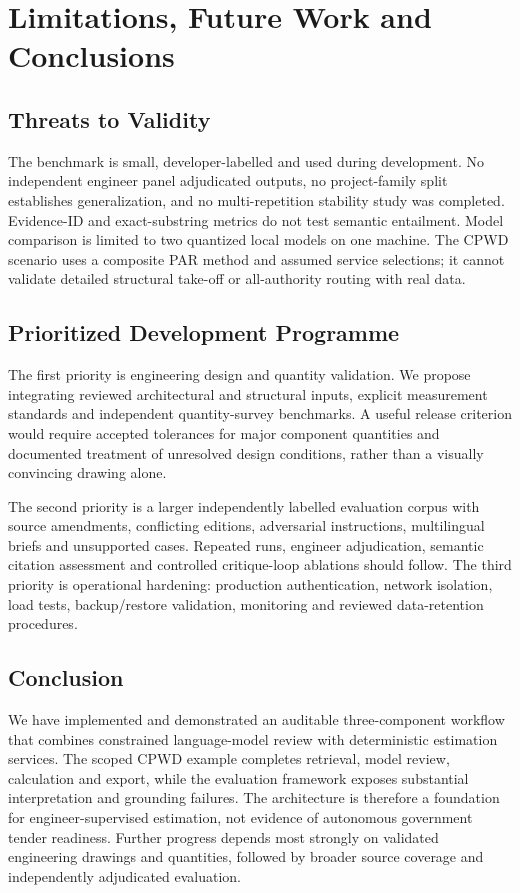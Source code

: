 \documentclass[11pt,a4paper]{article}
\begin{document}
\section{Limitations, Future Work and Conclusions}
\subsection{Threats to Validity}
The benchmark is small, developer-labelled and used during development. No independent engineer panel adjudicated outputs, no project-family split establishes generalization, and no multi-repetition stability study was completed. Evidence-ID and exact-substring metrics do not test semantic entailment. Model comparison is limited to two quantized local models on one machine. The CPWD scenario uses a composite PAR method and assumed service selections; it cannot validate detailed structural take-off or all-authority routing with real data.

\subsection{Prioritized Development Programme}
The first priority is engineering design and quantity validation. We propose integrating reviewed architectural and structural inputs, explicit measurement standards and independent quantity-survey benchmarks. A useful release criterion would require accepted tolerances for major component quantities and documented treatment of unresolved design conditions, rather than a visually convincing drawing alone.

The second priority is a larger independently labelled evaluation corpus with source amendments, conflicting editions, adversarial instructions, multilingual briefs and unsupported cases. Repeated runs, engineer adjudication, semantic citation assessment and controlled critique-loop ablations should follow. The third priority is operational hardening: production authentication, network isolation, load tests, backup/restore validation, monitoring and reviewed data-retention procedures.

\subsection{Conclusion}
We have implemented and demonstrated an auditable three-component workflow that combines constrained language-model review with deterministic estimation services. The scoped CPWD example completes retrieval, model review, calculation and export, while the evaluation framework exposes substantial interpretation and grounding failures. The architecture is therefore a foundation for engineer-supervised estimation, not evidence of autonomous government tender readiness. Further progress depends most strongly on validated engineering drawings and quantities, followed by broader source coverage and independently adjudicated evaluation.
\end{document}
